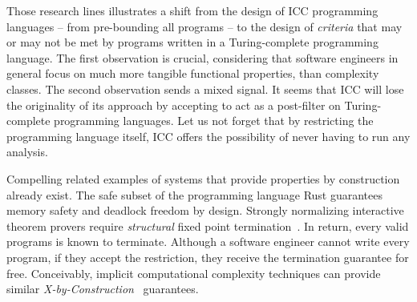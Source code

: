 
Those research lines illustrates a shift from the design of ICC programming languages -- from pre-bounding all programs --
to the design of \emph{criteria} that may or may not be met by programs written in a Turing-complete programming language.
The first observation is crucial, considering that software engineers in general focus on much more tangible functional properties,
than complexity classes.
The second observation sends a mixed signal.
It seems that ICC will lose the originality of its approach by accepting to act as a post-filter on Turing-complete programming languages.
Let us not forget that by restricting the programming language itself, ICC offers the possibility of never having to run any analysis.

Compelling related examples of systems that provide properties by construction already exist.
The safe subset of the programming language Rust guarantees \eg memory safety and deadlock freedom by design.
Strongly normalizing interactive theorem provers require \emph{structural} fixed point termination~\cite{bertot2004}.
In return, every valid programs is known to terminate.
Although a software engineer cannot write every program, if they accept the restriction, they receive the termination guarantee for free.
Conceivably, implicit computational complexity techniques can provide similar \emph{X-by-Construction}~\cite{terbeek2018} guarantees.
